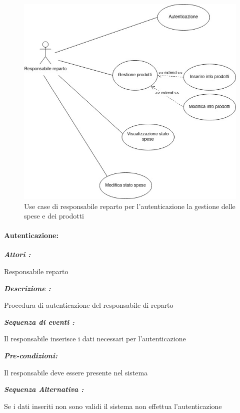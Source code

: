 \documentclass{article}
\begin{document}
\begin{figure}[h!]
	\centering
	\includegraphics[width=\textwidth]{UseCaseResponsabile.jpg}
	\caption{Use case di responsabile reparto per l'autenticazione la gestione delle spese e dei prodotti}
	\label{fig:UseCaseResponsabile}
\end{figure}

\paragraph{Autenticazione:}
\begin{mdframed}

	\noindent\textit{\textbf{Attori :}}


	Responsabile reparto

	\noindent\textit{\textbf{Descrizione :}}


	Procedura di autenticazione del responsabile di reparto

	\noindent\textit{\textbf{Sequenza di eventi :}}


	Il responsabile inserisce i dati necessari per l'autenticazione

	\noindent\textit{\textbf{Pre-condizioni:}}


	Il responsabile deve essere presente nel sistema

	\noindent\textit{\textbf{Sequenza Alternativa :}}


	Se i dati inseriti non sono validi il sistema non effettua
	l'autenticazione

\end{mdframed}
\end{document}
